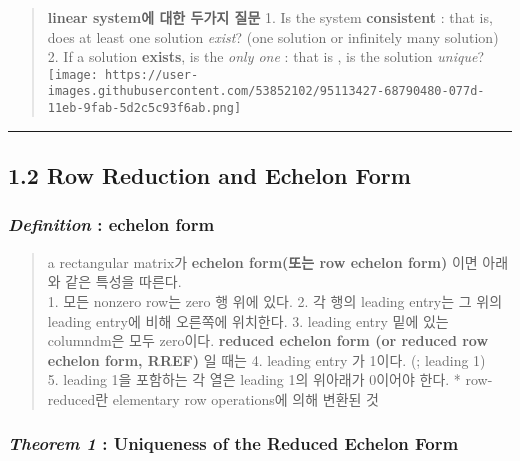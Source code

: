\documentclass[11pt]{article}
\begin{document}
\begin{quote}
\textbf{linear system에 대한 두가지 질문} 1. Is the system
\textbf{consistent} : that is, does at least one solution \emph{exist}?
(one solution or infinitely many solution) 2. If a solution
\textbf{exists}, is the \emph{only one} : that is , is the solution
\emph{unique}?
\texttt{[image: https://user-images.githubusercontent.com/53852102/95113427-68790480-077d-11eb-9fab-5d2c5c93f6ab.png]}
\end{quote}

    \begin{center}\rule{0.5\linewidth}{\linethickness}\end{center}

\hypertarget{row-reduction-and-echelon-form}{%
\subsection{1.2 Row Reduction and Echelon
Form}\label{row-reduction-and-echelon-form}}

\hypertarget{definition-echelon-form}{%
\subsubsection{\texorpdfstring{\emph{Definition} : echelon
form}{Definition : echelon form}}\label{definition-echelon-form}}

\begin{quote}
a rectangular matrix가 \textbf{echelon form(또는 row echelon form)} 이면
아래와 같은 특성을 따른다.\\
1. 모든 nonzero row는 zero 행 위에 있다. 2. 각 행의 leading entry는 그
위의 leading entry에 비해 오른쪽에 위치한다. 3. leading entry 밑에 있는
columndm은 모두 zero이다. \textbf{reduced echelon form (or reduced row
echelon form, RREF)} 일 때는 4. leading entry 가 1이다. (; leading 1)\\
5. leading 1을 포함하는 각 열은 leading 1의 위아래가 0이어야 한다. *
row-reduced란 elementary row operations에 의해 변환된 것
\end{quote}

    \hypertarget{theorem-1-uniqueness-of-the-reduced-echelon-form}{%
\subsubsection{\texorpdfstring{\emph{Theorem 1} : Uniqueness of the
Reduced Echelon
Form}{Theorem 1 : Uniqueness of the Reduced Echelon Form}}\label{theorem-1-uniqueness-of-the-reduced-echelon-form}}
\end{document}
